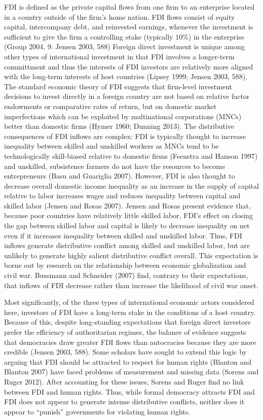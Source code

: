 \documentclass[a4paper]{article}\usepackage[]{graphicx}\usepackage[]{color}
\begin{document}
FDI is defined as the private capital flows from one firm to an enterprise located in a country outside of the firm's home nation. FDI flows consist of equity capital, intercompany debt, and reinvested earnings, whenever the investment is sufficient to give the firm a controlling stake (typically 10\%) in the enterprise (Group 2004, 9: Jensen 2003, 588) Foreign direct investment is unique among other types of international investment in that FDI involves a longer-term committment and thus the interests of FDI investors are relatively more aligned with the long-term interests of host countries (Lipsey 1999; Jensen 2003, 588). The standard economic theory of FDI suggests that firm-level investment decisions to invest directly in a foreign country are not based on relative factor endowments or comparative rates of return, but on domestic market imperfections which can be exploited by multinational corporations (MNCs) better than domestic firms (Hymer 1960; Dunning 2013). The distributive consequences of FDI inflows are complex: FDI is typically thought to increase inequality between skilled and unskilled workers as MNCs tend to be technologically skill-biased relative to domestic firms (Feenstra and Hanson 1997) and unskilled, subsistence farmers do not have the resources to become entrepreneurs (Basu and Guariglia 2007). However, FDI is also thought to decrease overall domestic income inequality as an increase in the supply of capital relative to labor increases wages and reduces inequality between capital and skilled labor (Jensen and Rosas 2007). Jensen and Rosas present evidence that, because poor countries have relatively little skilled labor, FDI's effect on closing the gap between skilled labor and capital is likely to decrease inequality on net even if it increases inequality between skilled and unskilled labor. Thus, FDI inflows generate distributive conflict among skilled and unskilled labor, but are unlikely to generate highly salient distributive conflict overall. This expectation is borne out by research on the relationship between economic globalization and civil war. Bussmann and Schneider (2007) find, contrary to their expectations, that inflows of FDI decrease rather than increase the likelihood of civil war onset.

Most significantly, of the three types of international economic actors considered here, investors of FDI have a long-term stake in the conditions of a host country. Because of this, despite long-standing expectations that foreign direct investors prefer the efficiency of authoritarian regimes, the balance of evidence suggests that democracies draw greater FDI flows than autocracies because they are more credible (Jensen 2003, 588). Some scholars have sought to extend this logic by arguing that FDI should be attracted to respect for human rights (Blanton and Blanton 2007) have faced problems of measurement and missing data (Sorens and Ruger 2012). After accounting for these issues, Sorens and Ruger find no link between FDI and human rights. Thus, while formal democracy attracts FDI and FDI does not appear to generate intense distributive conflicts, neither does it appear to “punish” governments for violating human rights.
\end{document}
